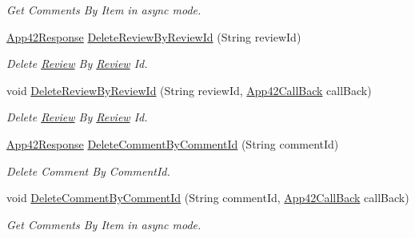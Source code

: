\begin{DoxyCompactItemize}
\begin{DoxyCompactList}\small\item\em Get Comments By Item in async mode. \end{DoxyCompactList}\item 
\hyperlink{classcom_1_1shephertz_1_1app42_1_1paas_1_1sdk_1_1csharp_1_1_app42_response}{App42\+Response} \hyperlink{classcom_1_1shephertz_1_1app42_1_1paas_1_1sdk_1_1csharp_1_1review_1_1_review_service_ad973232eb164203ab95c4236ecec0dcc}{Delete\+Review\+By\+Review\+Id} (String review\+Id)
\begin{DoxyCompactList}\small\item\em Delete \hyperlink{classcom_1_1shephertz_1_1app42_1_1paas_1_1sdk_1_1csharp_1_1review_1_1_review}{Review} By \hyperlink{classcom_1_1shephertz_1_1app42_1_1paas_1_1sdk_1_1csharp_1_1review_1_1_review}{Review} Id. \end{DoxyCompactList}\item 
void \hyperlink{classcom_1_1shephertz_1_1app42_1_1paas_1_1sdk_1_1csharp_1_1review_1_1_review_service_afafaad7354e3c4b008afdb41b31079bf}{Delete\+Review\+By\+Review\+Id} (String review\+Id, \hyperlink{interfacecom_1_1shephertz_1_1app42_1_1paas_1_1sdk_1_1csharp_1_1_app42_call_back}{App42\+Call\+Back} call\+Back)
\begin{DoxyCompactList}\small\item\em Delete \hyperlink{classcom_1_1shephertz_1_1app42_1_1paas_1_1sdk_1_1csharp_1_1review_1_1_review}{Review} By \hyperlink{classcom_1_1shephertz_1_1app42_1_1paas_1_1sdk_1_1csharp_1_1review_1_1_review}{Review} Id. \end{DoxyCompactList}\item 
\hyperlink{classcom_1_1shephertz_1_1app42_1_1paas_1_1sdk_1_1csharp_1_1_app42_response}{App42\+Response} \hyperlink{classcom_1_1shephertz_1_1app42_1_1paas_1_1sdk_1_1csharp_1_1review_1_1_review_service_acb75ef19608112fafe930fc4ca78abdd}{Delete\+Comment\+By\+Comment\+Id} (String comment\+Id)
\begin{DoxyCompactList}\small\item\em Delete Comment By Comment\+Id. \end{DoxyCompactList}\item 
void \hyperlink{classcom_1_1shephertz_1_1app42_1_1paas_1_1sdk_1_1csharp_1_1review_1_1_review_service_a1f7259693e568ccc70d2496da05ed79f}{Delete\+Comment\+By\+Comment\+Id} (String comment\+Id, \hyperlink{interfacecom_1_1shephertz_1_1app42_1_1paas_1_1sdk_1_1csharp_1_1_app42_call_back}{App42\+Call\+Back} call\+Back)
\begin{DoxyCompactList}\small\item\em Get Comments By Item in async mode. \end{DoxyCompactList}\item 

\end{DoxyCompactItemize}
